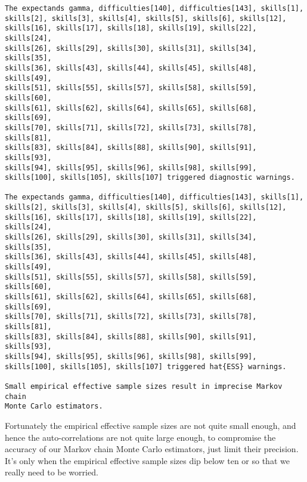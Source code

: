 \documentclass[
  letterpaper,
  DIV=11,
  numbers=noendperiod]{scrartcl}
\begin{document}
\begin{verbatim}
The expectands gamma, difficulties[140], difficulties[143], skills[1],
skills[2], skills[3], skills[4], skills[5], skills[6], skills[12],
skills[16], skills[17], skills[18], skills[19], skills[22], skills[24],
skills[26], skills[29], skills[30], skills[31], skills[34], skills[35],
skills[36], skills[43], skills[44], skills[45], skills[48], skills[49],
skills[51], skills[55], skills[57], skills[58], skills[59], skills[60],
skills[61], skills[62], skills[64], skills[65], skills[68], skills[69],
skills[70], skills[71], skills[72], skills[73], skills[78], skills[81],
skills[83], skills[84], skills[88], skills[90], skills[91], skills[93],
skills[94], skills[95], skills[96], skills[98], skills[99],
skills[100], skills[105], skills[107] triggered diagnostic warnings.

The expectands gamma, difficulties[140], difficulties[143], skills[1],
skills[2], skills[3], skills[4], skills[5], skills[6], skills[12],
skills[16], skills[17], skills[18], skills[19], skills[22], skills[24],
skills[26], skills[29], skills[30], skills[31], skills[34], skills[35],
skills[36], skills[43], skills[44], skills[45], skills[48], skills[49],
skills[51], skills[55], skills[57], skills[58], skills[59], skills[60],
skills[61], skills[62], skills[64], skills[65], skills[68], skills[69],
skills[70], skills[71], skills[72], skills[73], skills[78], skills[81],
skills[83], skills[84], skills[88], skills[90], skills[91], skills[93],
skills[94], skills[95], skills[96], skills[98], skills[99],
skills[100], skills[105], skills[107] triggered hat{ESS} warnings.

Small empirical effective sample sizes result in imprecise Markov chain
Monte Carlo estimators.
\end{verbatim}

Fortunately the empirical effective sample sizes are not quite small
enough, and hence the auto-correlations are not quite large enough, to
compromise the accuracy of our Markov chain Monte Carlo estimators, just
limit their precision. It's only when the empirical effective sample
sizes dip below ten or so that we really need to be worried.
\end{document}
